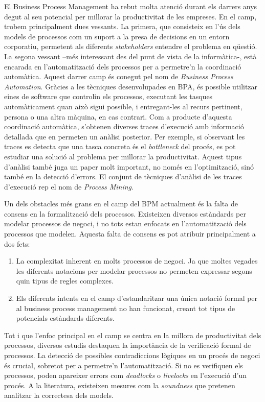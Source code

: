 El Business Process Management ha rebut molta atenció durant els darrers anys degut al seu potencial per millorar la productivitat de les empreses. En el camp, trobem principalment dues vessants. La primera, que consisteix en l'ús dels models de processos com un suport a la presa de decisions en un entorn corporatiu, permetent als diferents \emph{stakeholders} entendre el problema en qüestió. La segona vessant --més interessant des del punt de vista de la informàtica-, està encarada en l'automatització dels processos per a permetre'n la coordinació automàtica. Aquest darrer camp és conegut pel nom de \emph{Business Process Automation}. Gràcies a les tècniques desenvolupades en BPA, és possible utilitzar eines de software que controlin els processos, executant les tasques automàticament quan això sigui possible, i entregant-les al recurs pertinent, persona o una altra màquina, en cas contrari. Com a producte d'aquesta coordinació automàtica, s'obtenen diverses traces d'execució amb informació detallada que en permeten un anàlisi posterior. Per exemple, si observant les traces es detecta que una tasca concreta és el \emph{bottleneck} del procés, es pot estudiar una solució al problema per millorar la productivitat. Aquest tipus d'anàlisi també juga un paper molt important, no només en l'optimització, sinó també en la detecció d'errors. El conjunt de tècniques d'anàlisi de les traces d'execució rep el nom de \emph{Process Mining}.

Un dels obstacles més grans en el camp del BPM actualment és la falta de consens en la formalització dels processos. Existeixen diversos estàndards per modelar processos de negoci, i no tots estan enfocats en l'automatització dels processos que modelen. Aquesta falta de consens es pot atribuir principalment a dos fets: 

\begin{enumerate}
    \item La complexitat inherent en molts processos de negoci. Ja que moltes vegades les diferents notacions per modelar processos no permeten expressar segons quin tipus de regles complexes.
    \item Els diferents intents en el camp d'estandaritzar una única notació formal per al business process management no han funcionat, creant tot tipus de potencials estàndards diferents.
\end{enumerate}

Tot i que l'enfoc principal en el camp se centra en la millora de productivitat dels processos, diversos estudis destaquen la importància de la verificació formal de processos. La detecció de possibles contradiccions lògiques en un procés de negoci és crucial, sobretot per a permetre'n l'automatització. Si no es verifiquen els processos, poden apareixer errors com \emph{deadlocks} o \emph{livelocks} en l'execució d'un procés. A la literatura, existeixen mesures com la \emph{soundness}\cite{soundness} que pretenen analitzar la correctesa dels models.

